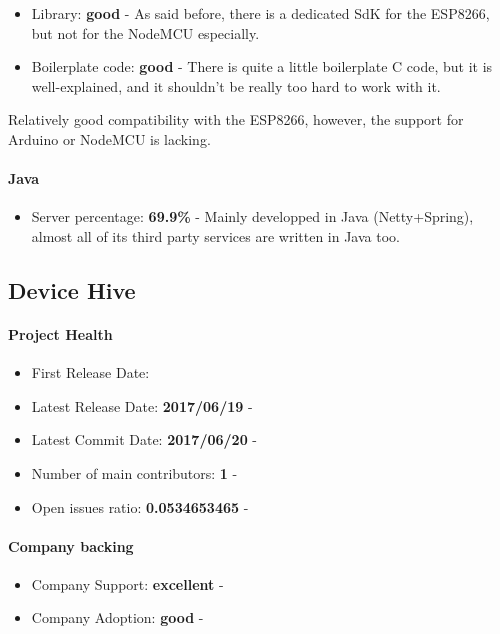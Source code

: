 \documentclass{article}
\begin{document}
\begin{itemize}
\item Library: \textbf{good} - As said before, there is a dedicated SdK for the ESP8266, but not for the NodeMCU especially.
\item Boilerplate code: \textbf{good} - There is quite a little boilerplate C code, but it is well-explained, and it shouldn't be really too hard to work with it.
\end{itemize}

Relatively good compatibility with the ESP8266, however, the support for Arduino or NodeMCU is lacking.

\paragraph{Java} 

\begin{itemize}
\item Server percentage: \textbf{69.9\%} - Mainly developped in Java (Netty+Spring), almost all of its third party services are written in Java too.
\end{itemize}

\subsection{Device Hive}

\paragraph{Project Health}

\begin{itemize}
\item First Release Date: 
\item Latest Release Date: \textbf{2017/06/19} - 
\item Latest Commit Date: \textbf{2017/06/20} - 
\item Number of main contributors: \textbf{1} - 
\item Open issues ratio: \textbf{0.0534653465} - 
\end{itemize}

\paragraph{Company backing}

\begin{itemize}
\item Company Support: \textbf{excellent} - 
\item Company Adoption: \textbf{good} - 
\end{itemize}
\end{document}
